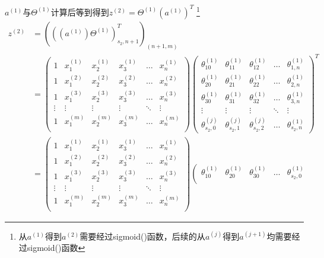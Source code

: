 $a^{(1)}$与$\Theta^{(1)}$计算后等到得到$z^{(2)}=\Theta^{(1)}(a^{(1)})^T$
\footnote{从$a^{(1)}$得到$a^{(2)}$需要经过sigmoid()函数，后续的从$a^{(j)}$得到$a^{(j+1)}$均需要经过sigmoid()函数}
\begin{equation}\begin{aligned}
	z^{(2)} &= (((a^{(1)}) \Theta^{(1)})_{s_{2},n+1}^T)_{(n+1, m)}
		\\ &= 
		  \left(\begin{matrix}
				1 & x_1^{(1)} & x_2^{(1)} & x_3^{(1)} & \dots & x_n^{(1)} \\
				1 & x_1^{(2)} & x_2^{(2)} & x_3^{(2)} & \dots & x_n^{(2)} \\
				1 & x_1^{(3)} & x_2^{(3)} & x_3^{(3)} & \dots & x_n^{(3)} \\
				\vdots        & \vdots    & \vdots    & \vdots    & \ddots & \vdots   \\
				1 & x_1^{(m)} & x_2^{(m)} & x_3^{(m)} & \dots & x_n^{(m)} \\
			\end{matrix}\right)
			\left(\begin{matrix}
				\theta_{10}^{(1)} & \theta_{11}^{(1)} & \theta_{12}^{(1)} & \dots & \theta_{1,n}^{(1)} \\
				\theta_{20}^{(1)} & \theta_{21}^{(1)} & \theta_{22}^{(1)} & \dots & \theta_{2,n}^{(1)} \\
				\theta_{30}^{(1)} & \theta_{31}^{(1)} & \theta_{32}^{(1)} & \dots & \theta_{3,n}^{(1)} \\
				\vdots    & \vdots    & \vdots    & \ddots & \vdots   \\
				\theta_{s_{2},0}^{(j)} & \theta_{s_{2},1}^{(j)} & \theta_{s_{2},2}^{(j)} & \dots & \theta_{s_{2},n}^{(1)}
			\end{matrix}\right)^T
		\\ &= 
		  \left(\begin{matrix}
				1 & x_1^{(1)} & x_2^{(1)} & x_3^{(1)} & \dots & x_n^{(1)} \\
				1 & x_1^{(2)} & x_2^{(2)} & x_3^{(2)} & \dots & x_n^{(2)} \\
				1 & x_1^{(3)} & x_2^{(3)} & x_3^{(3)} & \dots & x_n^{(3)} \\
				\vdots        & \vdots    & \vdots    & \vdots    & \ddots & \vdots   \\
				1 & x_1^{(m)} & x_2^{(m)} & x_3^{(m)} & \dots & x_n^{(m)} \\
			\end{matrix}\right)
			\left(\begin{matrix}
				\theta_{10}^{(1)} & \theta_{20}^{(1)} & \theta_{30}^{(1)} & \dots & \theta_{s_{2},0}^{(1)} \\

\end{matrix}
\end{aligned}
\end{equation}
